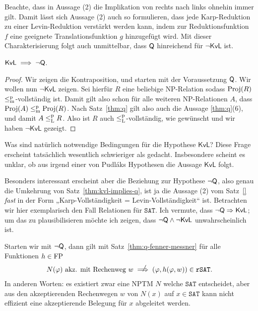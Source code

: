 Beachte, dass in Aussage (2) die Implikation von rechts nach links ohnehin immer gilt. 
Damit lässt sich Aussage (2) auch so formulieren, dass jede Karp-Reduktion zu einer Levin-Reduktion verstärkt werden kann, indem zur Reduktionsfunktion $f$ eine geeignete Translationsfunktion $g$ hinzugefügt wird.
Mit dieser Charakterisierung folgt auch unmittelbar, dass $\mathsf{Q}$ hinreichend für $\neg\mathsf{KvL}$ ist.


\begin{theorem}\label{thm:kvl-implies-q}
    $\mathsf{KvL} \implies \neg\mathsf{Q}$.
\end{theorem}
\begin{proof}
    Wir zeigen die Kontraposition, und starten mit der Voraussetzung $\mathsf{Q}$.
    Wir wollen nun $\neg\mathsf{KvL}$ zeigen. Sei hierfür $R$ eine beliebige NP-Relation sodass $\operatorname{Proj}(R)$ $\leq_\mathrm{m}^\mathrm{p}$-vollständig ist.
    Damit gilt also schon für alle weiteren NP-Relationen $A$, dass $\operatorname{Proj}(A)\leq_\mathrm{m}^\mathrm{p}\operatorname{Proj}(R)$.
    Nach Satz~\ref{thm:q} gilt also auch die Aussage \ref{thm:q}(6), und damit $A\leq_\mathrm{L}^\mathrm{p} R$. Also ist $R$ auch $\leq_\mathrm{L}^\mathrm{p}$-vollständig, wie gewünscht und wir haben $\neg\mathsf{KvL}$ gezeigt.
\end{proof}

Was sind natürlich notwendige Bedingungen für die Hypothese $\mathsf{KvL}$? Diese Frage erscheint tatsächlich wesentlich schwieriger als gedacht. Insbesondere scheint es unklar, ob aus irgend einer von Pudláks Hypothesen die Aussage $\mathsf{KvL}$ folgt.

Besonders interessant erscheint aber die Beziehung zur Hypothese $\neg\mathsf{Q}$, also genau die Umkehrung von Satz~\ref{thm:kvl-implies-q}, ist ja die Aussage (2) vom Satz~\ref{} \emph{fast} in der Form „Karp-Vollständigkeit = Levin-Vollständigkeit“ ist.
Betrachten wir hier exemplarisch den Fall Relationen für $\mathtt{SAT}$. Ich vermute, dass $\neg\mathsf{Q}\Rightarrow \mathsf{KvL}$; um das zu plausibilisieren möchte ich zeigen, dass $\neg\mathsf{Q}\land\neg\mathsf{KvL}$ unwahrscheinlich ist.

Starten wir mit $\neg\mathsf{Q}$, dann gilt mit Satz~\ref{thm:q-fenner-messner} für alle Funktionen $h\in\mathrm{FP}$
\begin{equation} N(\phi) \text{ akz. mit Rechenweg $w$} \rlap{\hspace*{2pt}\raisebox{2.3pt}{$\quad\not$}}\implies  (\phi, h(\phi, w))\in\mathtt{rSAT}.\label{eq:weak-irreducibility} \end{equation}
In anderen Worten: es existiert zwar eine NPTM $N$ welche $\mathtt{SAT}$ entscheidet, aber aus den akzeptierenden Rechenwegen $w$ von $N(x)$ auf $x\in \mathtt{SAT}$ kann nicht effizient eine akzeptierende Belegung für $x$ abgeleitet werden.

